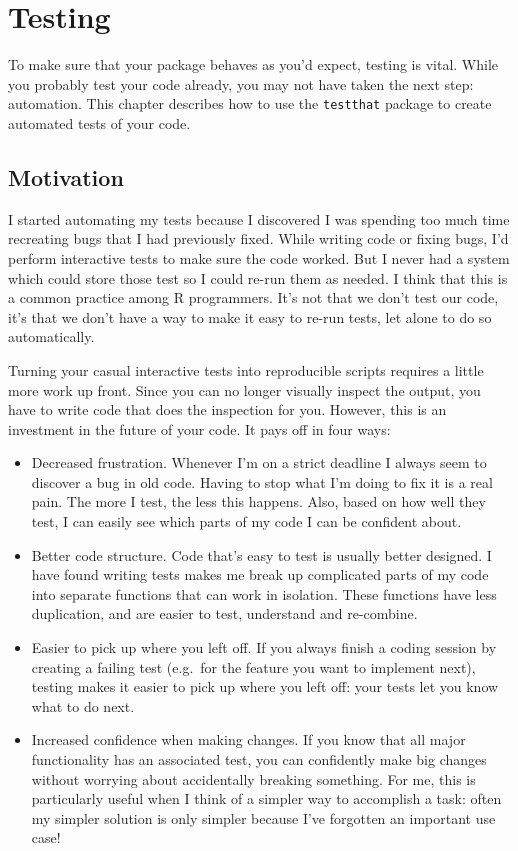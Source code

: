 \chapter{Testing}

To make sure that your package behaves as you'd expect, testing is
vital. While you probably test your code already, you may not have taken
the next step: automation. This chapter describes how to use the
\texttt{testthat} package to create automated tests of your code.

\section{Motivation}

I started automating my tests because I discovered I was spending too
much time recreating bugs that I had previously fixed. While writing
code or fixing bugs, I'd perform interactive tests to make sure the code
worked. But I never had a system which could store those test so I could
re-run them as needed. I think that this is a common practice among R
programmers. It's not that we don't test our code, it's that we don't
have a way to make it easy to re-run tests, let alone to do so
automatically.

Turning your casual interactive tests into reproducible scripts requires
a little more work up front. Since you can no longer visually inspect
the output, you have to write code that does the inspection for you.
However, this is an investment in the future of your code. It pays off
in four ways:

\begin{itemize}
\item
  Decreased frustration. Whenever I'm on a strict deadline I always seem
  to discover a bug in old code. Having to stop what I'm doing to fix it
  is a real pain. The more I test, the less this happens. Also, based on
  how well they test, I can easily see which parts of my code I can be
  confident about.
\item
  Better code structure. Code that's easy to test is usually better
  designed. I have found writing tests makes me break up complicated
  parts of my code into separate functions that can work in isolation.
  These functions have less duplication, and are easier to test,
  understand and re-combine.
\item
  Easier to pick up where you left off. If you always finish a coding
  session by creating a failing test (e.g.~for the feature you want to
  implement next), testing makes it easier to pick up where you left
  off: your tests let you know what to do next.
\item
  Increased confidence when making changes. If you know that all major
  functionality has an associated test, you can confidently make big
  changes without worrying about accidentally breaking something. For
  me, this is particularly useful when I think of a simpler way to
  accomplish a task: often my simpler solution is only simpler because
  I've forgotten an important use case!
\end{itemize}

